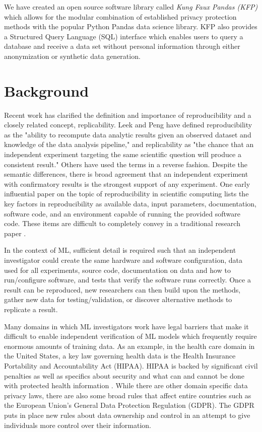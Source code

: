 \documentclass{article}
\begin{document}
We have created an open source software library called \emph{Kung Faux Pandas (KFP)} which allows for the modular combination of established privacy protection methods with the popular Python Pandas data science library\cite{mckinney-proc-scipy-2010}. KFP also provides a Structured Query Language (SQL) interface which enables users to query a database and receive a data set without personal information through either anonymization or synthetic data generation.

\section{Background}

Recent work has clarified the definition and importance of reproducibility and a closely related concept, replicability. Leek and Peng have defined reproducibility as the "ability to recompute data analytic results given an observed dataset and knowledge of the data analysis pipeline," and replicability as "the chance that an independent experiment targeting the same scientific question will produce a consistent result."\cite{leek_opinion_2015,peng_reproducible_2006} Others have used the terms in a reverse fashion.\cite{drummond_replicability_2009} Despite the semantic differences, there is broad agreement that an independent experiment with confirmatory results is the strongest support of any experiment. One early influential paper on the topic of reproducibility in scientific computing lists the key factors in reproducibility as available data, input parameters, documentation, software code, and an environment capable of running the provided software code. These items are difficult to completely convey in a traditional research paper \cite{schwab_making_2000}.

In the context of ML, sufficient detail is required such that an independent investigator could create the same hardware and software configuration, data used for all experiments, source code, documentation on data and how to run/configure software, and tests that verify the software runs correctly. Once a result can be reproduced, new researchers can then build upon the methods, gather new data for testing/validation, or discover alternative methods to replicate a result.

Many domains in which ML investigators work have legal barriers that make it difficult to enable independent verification of ML models which frequently require enormous amounts of training data. As an example, in the health care domain in the United States, a key law governing health data is the Health Insurance Portability and Accountability Act (HIPAA). HIPAA is backed by significant civil penalties as well as specifics about security and what can and cannot be done with protected health information \cite{hippaviol}. While there are other domain specific data privacy laws, there are also some broad rules that affect entire countries such as the European Union's General Data Protection Regulation (GDPR). The GDPR puts in place new rules about data ownership and control in an attempt to give individuals more control over their information.
\end{document}
